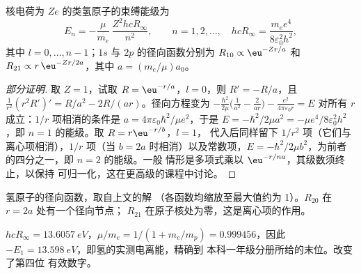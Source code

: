\begin{theorem}[氢原子的能级]\label{thm:b3:quantum-model-systems:hydrogen}
核电荷为 $Ze$ 的类氢原子的束缚能级为
\[
E_n = -\frac{\mu}{m_e}\,\frac{Z^2hcR_\infty}{n^2}, \qquad n = 1, 2, \dots,
\quad hcR_\infty = \frac{m_ee^4}{8\varepsilon_0^2h^2},
\]
其中 $l = 0, \dots, n - 1$；$1s$ 与 $2p$ 的径向函数分别为 $R_{10}
\propto \eu^{-Zr/a}$ 和 $R_{21} \propto r\,\eu^{-Zr/2a}$，其中 $a =
(m_e/\mu)a_0$。
\end{theorem}

\begin{proof}[部分证明]
取 $Z = 1$，试取 $R = \eu^{-r/a}$，$l = 0$，则 $R' = -R/a$，且
$\frac{1}{r^2}(r^2R')' = R/a^2 - 2R/(ar)$。径向方程变为
$-\frac{\hbar^2}{2\mu}\big(\frac{1}{a^2} - \frac{2}{ar}\big) - \frac{e^2}{4\pi
\varepsilon_0r} = E$ 对所有 $r$ 成立：$1/r$ 项相消的条件是 $a =
4\pi\varepsilon_0\hbar^2/\mu e^2$，于是 $E = -\hbar^2/2\mu a^2 = -\mu
e^4/8\varepsilon_0^2h^2$，即 $n = 1$ 的能级。取 $R = r\eu^{-r/b}$，$l = 1$，
代入后同样留下 $1/r^2$ 项（它们与
离心项相消），$1/r$ 项（当 $b = 2a$ 时相消）以及常数项，$E =
-\hbar^2/2\mu b^2$，为前者的四分之一，即 $n = 2$ 的能级。一般
情形是多项式乘以 $\eu^{-r/na}$，其级数须终止，以保持
可归一化，这在更高级的课程中讨论。
\end{proof}

\begin{omfigure}

{\small 氢原子的径向函数，取自上文的解
（各函数均缩放至最大值约为 1）。$R_{20}$ 在 $r = 2a$ 处有一个径向节点；
$R_{21}$ 在原子核处为零，这是离心项的作用。}
\end{omfigure}

\begin{example}[氢的电离能]\label{ex:b3:quantum-model-systems:ie}
$hcR_\infty = \qty{13.6057}{eV}$，$\mu/m_e = 1/(1 + m_e/m_p) = 0.999456$，因此
$-E_1 = \qty{13.598}{eV}$，即氢的实测电离能，精确到
本科一年级分册所给的末位。改变了第四位
有效数字。
\end{example}

